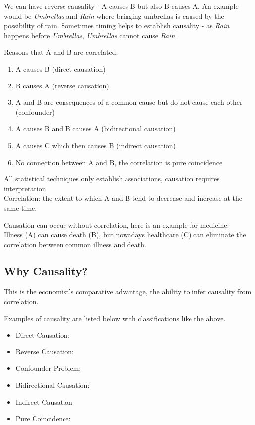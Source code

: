 \documentclass[12pt, letterpaper]{article}
\begin{document}
{\noindent We can have reverse causality - A causes B but also B causes A. An example would be \textit{Umbrellas} and \textit{Rain} where bringing umbrellas is caused by the possibility of rain. Sometimes timing helps to establish causality - as \textit{Rain} happens before \textit{Umbrellas}, \textit{Umbrellas} cannot cause \textit{Rain}.

\vspace{10pt}
\noindent Reasons that A and B are correlated:
\begin{enumerate}
	\item A causes B (direct causation)
	\item B causes A (reverse causation)
	\item A and B are consequences of a common cause but do not cause each other (confounder)
	\item A causes B and B causes A (bidirectional causation)
	\item A causes C which then causes B (indirect causation)
	\item No connection between A and B, the correlation is pure coincidence
\end{enumerate}
All statistical techniques only establish associations, causation requires interpretation.\\
Correlation: the extent to which A and B tend to decrease and increase at the same time.

\vspace{10pt}
\noindent Causation can occur without correlation, here is an example for medicine:\\
Illness (A) can cause death (B), but nowadays healthcare (C) can eliminate the correlation between common illness and death.

\subsection{Why Causality?}
This is the economist's comparative advantage, the ability to infer causality from correlation.

\vspace{10pt}
\noindent Examples of causality are listed below with classifications like the above.
\begin{itemize}
	\item Direct Causation:
	\item Reverse Causation:
	\item Confounder Problem:
	\item Bidirectional Causation:
	\item Indirect Causation
	\item Pure Coincidence:
\end{itemize}

}
\end{document}
